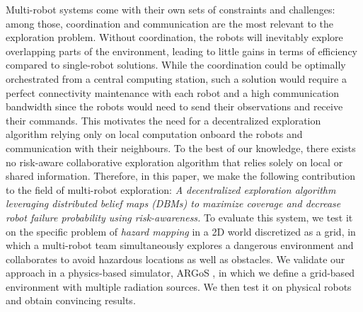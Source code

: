 Multi-robot systems come with their own sets of constraints and
challenges: among those, coordination and communication are the most
relevant to the exploration problem. Without coordination, the robots
will inevitably explore overlapping parts of the environment, leading
to little gains in terms of efficiency compared to single-robot
solutions. While the coordination could be optimally orchestrated from
a central computing station, such a solution would require a perfect
connectivity maintenance with each robot and a high communication
bandwidth since the robots would need to send their observations and
receive their commands. This motivates the need for a decentralized
exploration algorithm relying only on local computation onboard the
robots and communication with their neighbours. To the best of our knowledge, there exists no risk-aware collaborative
exploration algorithm that relies solely on local or shared
information. Therefore, in this paper, we make the following
contribution to the field of multi-robot exploration: \textit{A
  decentralized exploration algorithm leveraging distributed belief
  maps (DBMs) to maximize coverage and decrease robot failure
  probability using risk-awareness.} To
evaluate this system, we test it on the specific problem of
\emph{hazard mapping} in a 2D world discretized as a grid, in which a
multi-robot team simultaneously explores a dangerous environment and
collaborates to avoid hazardous locations as well as obstacles. We validate our approach in a physics-based simulator, ARGoS
\cite{Pinciroli:SI2012}, in which we define a grid-based environment
with multiple radiation sources. We then test it on physical
robots and obtain convincing results. 

